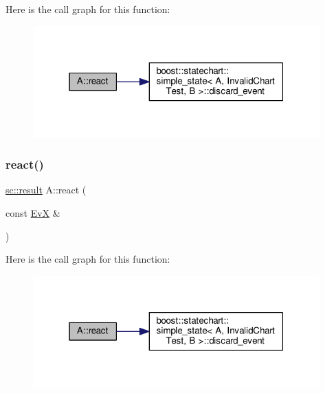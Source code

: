 Here is the call graph for this function\+:
\nopagebreak
\begin{figure}[H]
\begin{center}
\leavevmode
\includegraphics[width=313pt]{struct_a_adf85098984576064f58c36259a6b58c9_cgraph}
\end{center}
\end{figure}
\mbox{\label{struct_a_adf85098984576064f58c36259a6b58c9}} 
\subsubsection{\texorpdfstring{react()}{react()}\hspace{0.1cm}{\footnotesize\ttfamily [2/11]}}
{\footnotesize\ttfamily \mbox{\hyperlink{namespaceboost_1_1statechart_abe807f6598b614d6d87bb951ecd92331}{sc\+::result}} A\+::react (\begin{DoxyParamCaption}\item[{const \mbox{\hyperlink{struct_ev_x}{EvX}} \&}]{ }\end{DoxyParamCaption})\hspace{0.3cm}{\ttfamily [inline]}}

Here is the call graph for this function\+:
\nopagebreak
\begin{figure}[H]
\begin{center}
\leavevmode
\includegraphics[width=313pt]{struct_a_adf85098984576064f58c36259a6b58c9_cgraph}
\end{center}
\end{figure}
\mbox{\label{struct_a_a7eaee5c73ef0a2a5fb0886b4b1bc4a48}} 
